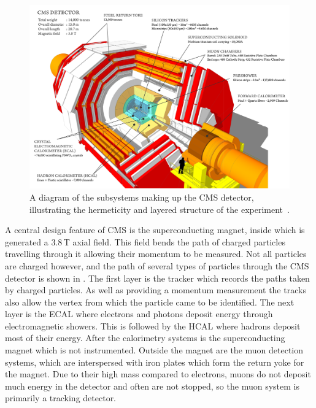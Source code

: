 \begin{figure}
  \includegraphics[width=1.2\largefigwidth]{plots/detector/cms_120918_03.png}
  \caption[A diagram of the subsystems making up the CMS detector, illustrating the hermeticity and layered structure of the experiment.]{A diagram of the subsystems making up the CMS detector, illustrating the hermeticity and layered structure of the experiment~\cite{cmsschematic}.}
  \label{fig:cmsschematic1}
\end{figure}

A central design feature of CMS is the superconducting magnet, inside which is generated a 3.8\,T axial field. This field bends the path of charged particles travelling through it allowing their momentum to be measured. Not all particles are charged however, and the path of several types of particles through the CMS detector is shown in . The first layer is the tracker which records the paths taken by charged particles. As well as providing a momentum measurement the tracks also allow the vertex from which the particle came to be identified. The next layer is the \ac{ECAL} where electrons and photons deposit energy through electromagnetic showers. This is followed by the \ac{HCAL} where hadrons deposit most of their energy. After the calorimetry systems is the superconducting magnet which is not instrumented. Outside the magnet are the muon detection systems, which are interspersed with iron plates which form the return yoke for the magnet. Due to their high mass compared to electrons, muons do not deposit much energy in the detector and often are not stopped, so the muon system is primarily a tracking detector.

